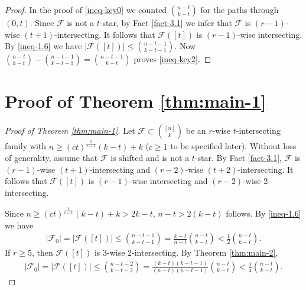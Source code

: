 \documentclass[11pt,a4paper]{article}
\newtheorem{false statement}{False statement}
\theoremstyle{definition}
\def\hf{\mathcal{F}}
\begin{document}
\begin{proof}
In the proof of \eqref{ineq-key0} we counted $\binom{n-t}{k-t}$ for the paths through $(0,t)$. Since $\hf$ is not a $t$-star, by Fact \ref{fact-3.1} we infer that  $\hf$ is $(r-1)$-wise $(t+1)$-intersecting. It follows that $\hf([t])$ is $(r-1)$-wise intersecting. By \eqref{ineq-1.6} we have $|\hf([t])| \leq \binom{n-t-1}{k-t-1}$. Now $\binom{n-t}{k-t}-\binom{n-t-1}{k-t-1} =\binom{n-t-1}{k-t}$ proves \eqref{ineq-key2}.
\end{proof}

\section{Proof of Theorem \ref{thm:main-1}}



\begin{proof}[Proof of Theorem \ref{thm:main-1}]
Let $\hf\subset \binom{[n]}{k}$ be an $r$-wise $t$-intersecting family with $n\geq (ct)^{\frac{1}{r-1}}(k-t)+k$ ($c\geq 1$ to be specified later). Without loss of generality, assume that $\hf$ is shifted and is not a $t$-star. By Fact \ref{fact-3.1}, $\hf$ is $(r-1)$-wise $(t+1)$-intersecting and  $(r-2)$-wise $(t+2)$-intersecting. It follows that
  $\hf([t])$ is $(r-1)$-wise intersecting and  $(r-2)$-wise 2-intersecting.

Since $n\geq (ct)^{\frac{1}{r-1}}(k-t)+k>2k-t$, $n-t> 2(k-t)$ follows. By \eqref{ineq-1.6} we have
\begin{align}\label{ineq-3.1}
|\hf_0|=|\hf([t])| \leq \binom{n-t-1}{k-t-1}= \frac{k-t}{n-t} \binom{n-t}{k-t} < \frac{1}{2} \binom{n-t}{k-t}.
\end{align}
If $r\geq 5$, then $\hf([t])$ is 3-wise 2-intersecting. By Theorem \ref{thm:main-2},
\begin{align}\label{ineq-3.1-2}
|\hf_0|=|\hf([t])| \leq \binom{n-t-2}{k-t-2}= \frac{(k-t)(k-t-1)}{(n-t)(n-t-1)} \binom{n-t}{k-t} < \frac{1}{4} \binom{n-t}{k-t}.
\end{align}


\end{proof}
\end{document}
